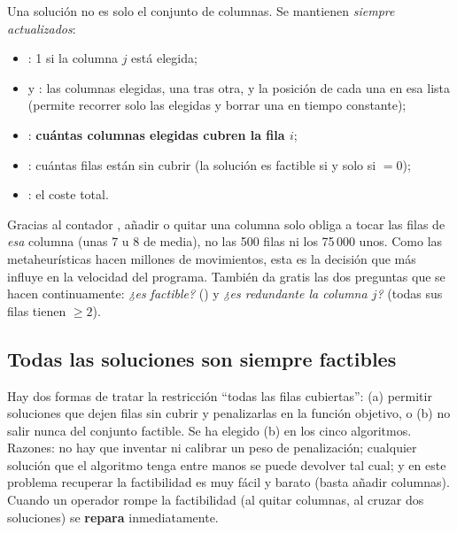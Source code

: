 Una solución no es solo el conjunto de columnas. Se mantienen \emph{siempre actualizados}:
\begin{itemize}
  \item {}: 1 si la columna $j$ está elegida;
  \item {} y : las columnas elegidas, una tras otra, y la posición de cada
        una en esa lista (permite recorrer solo las elegidas y borrar una en tiempo constante);
  \item {}: \textbf{cuántas columnas elegidas cubren la fila $i$};
  \item {}: cuántas filas están sin cubrir (la solución es factible si y solo si
         $=0$);
  \item {}: el coste total.
\end{itemize}

\begin{idea}
Gracias al contador , añadir o quitar una columna solo obliga a tocar las filas de
\emph{esa} columna (unas 7 u 8 de media), no las 500 filas ni los 75\,000 unos. Como las
metaheurísticas hacen millones de movimientos, esta es la decisión que más influye en la
velocidad del programa. También da gratis las dos preguntas que se hacen continuamente:
\emph{¿es factible?} () y \emph{¿es redundante la columna $j$?} (todas sus
filas tienen  $\ge 2$).
\end{idea}


\subsection{Todas las soluciones son siempre factibles}

\begin{decision}
Hay dos formas de tratar la restricción ``todas las filas cubiertas'': (a) permitir soluciones
que dejen filas sin cubrir y penalizarlas en la función objetivo, o (b) no salir nunca del
conjunto factible. Se ha elegido (b) en los cinco algoritmos. Razones: no hay que inventar ni
calibrar un peso de penalización; cualquier solución que el algoritmo tenga entre manos se
puede devolver tal cual; y en este problema recuperar la factibilidad es muy fácil y barato
(basta añadir columnas). Cuando un operador rompe la factibilidad (al quitar columnas, al
cruzar dos soluciones) se \textbf{repara} inmediatamente.
\end{decision}

